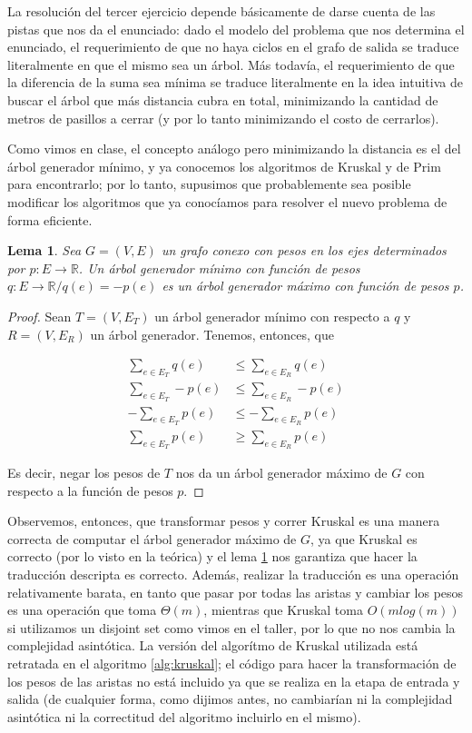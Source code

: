 \documentclass{article}
\newtheorem{lemma}{Lema}[theorem]
\theoremstyle{definition}
\theoremstyle{remark}
\begin{document}
La resolución del tercer ejercicio depende básicamente de darse cuenta de las pistas que nos da el enunciado: dado el modelo del problema que nos determina el enunciado, el requerimiento de que no haya ciclos en el grafo de salida se traduce literalmente en que el mismo sea un árbol. Más todavía, el requerimiento de que la diferencia de la suma sea mínima se traduce literalmente en la idea intuitiva de buscar el árbol que más distancia cubra en total, minimizando la cantidad de metros de pasillos a cerrar (y por lo tanto minimizando el costo de cerrarlos).

Como vimos en clase, el concepto análogo pero minimizando la distancia es el del árbol generador mínimo, y ya conocemos los algoritmos de Kruskal y de Prim para encontrarlo; por lo tanto, supusimos que probablemente sea posible modificar los algoritmos que ya conocíamos para resolver el nuevo problema de forma eficiente.

\begin{lemma}
Sea $G = (V, E)$ un grafo conexo con pesos en los ejes determinados por $p : E \to \mathbb{R}$. Un árbol generador mínimo con función de pesos $q : E \to \mathbb{R} / q(e) = -p(e)$ es un árbol generador máximo con función de pesos $p$.
\label{pr:agm}
\end{lemma}

\begin{proof}
Sean $T = (V, E_T)$ un árbol generador mínimo con respecto a $q$ y $R = (V, E_R)$ un árbol generador. Tenemos, entonces, que

\begin{align*}
\sum_{e \in E_T} q(e) &\leq \sum_{e \in E_R} q(e)\\
\sum_{e \in E_T} -p(e) &\leq \sum_{e \in E_R} -p(e)\\
-\sum_{e \in E_T} p(e) &\leq -\sum_{e \in E_R} p(e)\\
\sum_{e \in E_T} p(e) &\geq \sum_{e \in E_R} p(e)
\end{align*}

Es decir, negar los pesos de $T$ nos da un árbol generador máximo de $G$ con respecto a la función de pesos $p$.
\end{proof}

Observemos, entonces, que transformar pesos y correr Kruskal es una manera correcta de computar el árbol generador máximo de $G$, ya que Kruskal es correcto (por lo visto en la teórica) y el lema \ref{pr:agm} nos garantiza que hacer la traducción descripta es correcto. Además, realizar la traducción es una operación relativamente barata, en tanto que pasar por todas las aristas y cambiar los pesos es una operación que toma $\Theta(m)$, mientras que Kruskal toma $O(m log(m))$ si utilizamos un disjoint set como vimos en el taller, por lo que no nos cambia la complejidad asintótica. La versión del algorítmo de Kruskal utilizada está retratada en el algoritmo \ref{alg:kruskal}; el código para hacer la transformación de los pesos de las aristas no está incluido ya que se realiza en la etapa de entrada y salida (de cualquier forma, como dijimos antes, no cambiarían ni la complejidad asintótica ni la correctitud del algoritmo incluirlo en el mismo).
\end{document}
